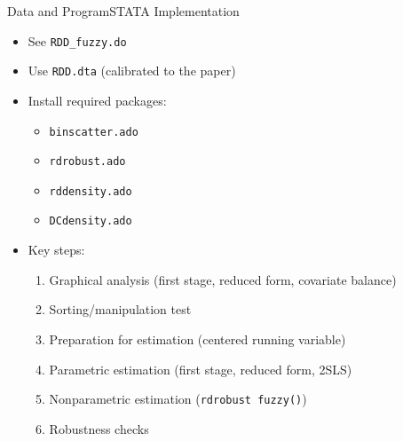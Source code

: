 \documentclass[hyperref={pdfpagelabels=false}]{beamer}
\begin{document}
\begin{frame}{Data and Program}{STATA Implementation}
	\begin{itemize}
		\item See \texttt{RDD\_fuzzy.do}
		\vspace{0.2cm}
		\item Use \texttt{RDD.dta} (calibrated to the paper)
		\vspace{0.2cm}
		\item Install required packages:
		\begin{itemize}
			\vspace{0.2cm}
			\item \texttt{binscatter.ado}
			\item \texttt{rdrobust.ado}
			\item \texttt{rddensity.ado}
			\item \texttt{DCdensity.ado}
		\end{itemize}
		\vspace{0.2cm}
		\item Key steps:
		\begin{enumerate}
			\vspace{0.2cm}
			\item Graphical analysis (first stage, reduced form, covariate balance)
			\item Sorting/manipulation test
			\item Preparation for estimation (centered running variable)
			\item Parametric estimation (first stage, reduced form, 2SLS)
			\item Nonparametric estimation (\texttt{rdrobust fuzzy()})
			\item Robustness checks
		\end{enumerate}
	\end{itemize}
\end{frame}
\end{document}
